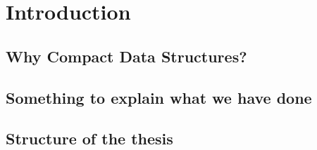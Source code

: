 
\chapter{Introduction} %

\label{ch:introduction} %

\section{Why Compact Data Structures?}

\section{Something to explain what we have done}




\section{Structure of the thesis}


